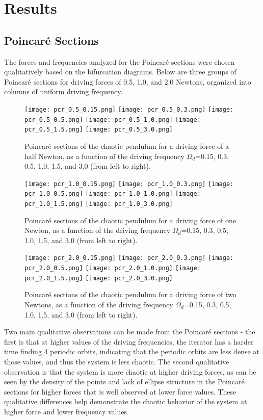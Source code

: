 \documentclass[11pt]{article} %
\begin{document}
\section{Results}
    \subsection{Poincar\'e Sections}
    The forces and frequencies analyzed for the Poincar\'e sections were chosen qualitatively based on the bifurcation diagrams. Below are
    three groups of Poincar\'e sections for driving forces of 0.5, 1.0, and 2.0 Newtons, organized into columns of uniform driving frequency. 
    \begin{figure}[H]
        \centering
        \texttt{[image: pcr\_0.5\_0.15.png]}
        \texttt{[image: pcr\_0.5\_0.3.png]}
        \texttt{[image: pcr\_0.5\_0.5.png]}
        \texttt{[image: pcr\_0.5\_1.0.png]}
        \texttt{[image: pcr\_0.5\_1.5.png]}
        \texttt{[image: pcr\_0.5\_3.0.png]}
        \caption{Poincar\'e sections of the chaotic pendulum for a driving force of a half Newton, as a function of the driving frequency $\Omega_d$=0.15, 0.3, 0.5, 1.0, 1.5, and 3.0 (from left to right).}
    \end{figure}
    \begin{figure}[H]
        \centering
        \texttt{[image: pcr\_1.0\_0.15.png]}
        \texttt{[image: pcr\_1.0\_0.3.png]}
        \texttt{[image: pcr\_1.0\_0.5.png]}
        \texttt{[image: pcr\_1.0\_1.0.png]}
        \texttt{[image: pcr\_1.0\_1.5.png]}
        \texttt{[image: pcr\_1.0\_3.0.png]}
        \caption{Poincar\'e sections of the chaotic pendulum for a driving force of one Newton, as a function of the driving frequency $\Omega_d$=0.15, 0.3, 0.5, 1.0, 1.5, and 3.0 (from left to right).}
    \end{figure}
    \begin{figure}[H]
        \centering
        \texttt{[image: pcr\_2.0\_0.15.png]}
        \texttt{[image: pcr\_2.0\_0.3.png]}
        \texttt{[image: pcr\_2.0\_0.5.png]}
        \texttt{[image: pcr\_2.0\_1.0.png]}
        \texttt{[image: pcr\_2.0\_1.5.png]}
        \texttt{[image: pcr\_2.0\_3.0.png]}
        \caption{Poincar\'e sections of the chaotic pendulum for a driving force of two Newtons, as a function of the driving frequency $\Omega_d$=0.15, 0.3, 0.5, 1.0, 1.5, and 3.0 (from left to right).}
        \label{fig:poincare}
    \end{figure}
    Two main qualitative observations can be made from the Poincar\'e sections - the first is that at higher values of the driving frequencies,
    the iterator has a harder time finding 4 periodic orbits, indicating that the periodic orbits are less dense at those values, and thus
    the system is less chaotic. The second qualitative observation is that the system is more chaotic at higher driving forces, as can be seen by the
    density of the points and lack of ellipse structure in the Poincar\'e sections for higher forces that is well observed at lower force values. These
    qualitative differences help demonstrate the chaotic behavior of the system at higher force and lower frequency values.\\
\end{document}
